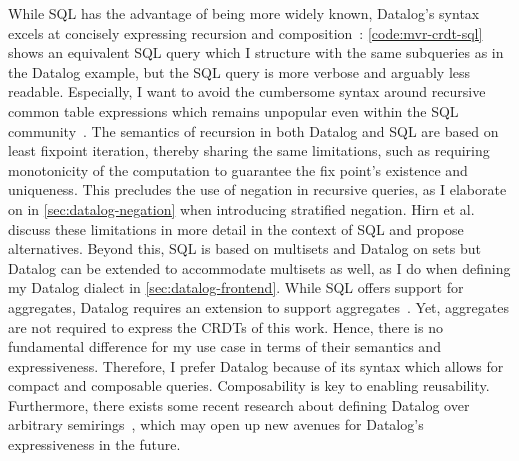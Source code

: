 While SQL has the advantage of being more widely known,
Datalog's syntax excels at concisely expressing recursion and
composition~\cite{abo2024convergence}:
\ref{code:mvr-crdt-sql} shows an equivalent SQL query which I structure
with the same subqueries as in the Datalog example,
but the SQL query is more verbose and arguably less readable.
Especially, I want to avoid the cumbersome syntax around recursive
common table expressions which remains unpopular even within the SQL
community~\cite{neumann2024critique, hirn2023fix, mcsherry2022recursion}.
The semantics of recursion in both Datalog and SQL are based on least
fixpoint iteration, thereby sharing the same limitations, such as requiring
monotonicity of the computation to guarantee the fix point's existence
and uniqueness. This precludes the use of negation in recursive queries,
as I elaborate on in \ref{sec:datalog-negation} when introducing stratified
negation.
Hirn et al. \cite{hirn2023fix} discuss these limitations in more detail
in the context of SQL and propose alternatives.
Beyond this, SQL is based on multisets and Datalog on sets but Datalog can
be extended to accommodate multisets as well, as I do when defining
my Datalog dialect in \ref{sec:datalog-frontend}.
While SQL offers support for aggregates,
Datalog requires an extension to support aggregates~\cite{green2013datalog}.
Yet, aggregates are not required to express the \acp{CRDT} of this work.
Hence, there is no fundamental difference for my use case
in terms of their semantics and expressiveness.
Therefore, I prefer Datalog because of its syntax which allows for compact
and composable queries. Composability is key to enabling reusability.
Furthermore, there exists some recent research about defining Datalog
over arbitrary semirings~\cite{abo2024convergence, khamis2022datalog},
which may open up new avenues for Datalog's expressiveness in the future.

